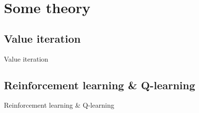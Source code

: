 \documentclass{beamer}
\begin{document}
\section{Some theory}
\subsection{Value iteration}
\begin{frame}{Value iteration}
\end{frame}

\subsection{Reinforcement learning \& Q-learning}
\begin{frame}{Reinforcement learning \& Q-learning}
\end{frame}
\end{document}

